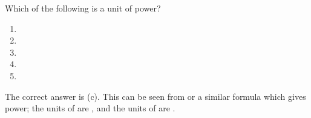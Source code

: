 
\begin{problem}[AO1989PIQ1l] 
{Which of the following is a unit of power?
\begin{enumerate}
	\item {}
	\item {}
	\item {}\answer
	\item {}
	\item {}
\end{enumerate}
}
{}
{The correct answer is (c). This can be seen from  or a similar formula which gives power; the units of  are , and the units of  are .}
\end{problem}